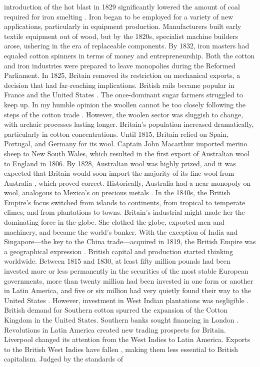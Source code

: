 introduction of the hot blast in 1829 significantly lowered the amount of coal required for iron smelting . Iron began to be employed for a variety of new applications, particularly in equipment production. Manufacturers built early textile equipment out of wood, but by the 1820s, specialist machine builders arose, ushering in the era of replaceable components. By 1832, iron masters had equaled cotton spinners  in terms of money and entrepreneurship. Both the cotton and iron industries were prepared to leave monopolies during the Reformed Parliament. In 1825, Britain removed its restriction on mechanical exports, a decision that had far-reaching implications. British rails became popular in France and the United States . The once-dominant sugar farmers struggled to keep up. In my humble opinion the woollen cannot be too closely following the steps of the cotton trade . However, the woolen sector was sluggish to change, with archaic processes lasting longer. Britain's population increased dramatically, particularly in cotton concentrations. Until 1815, Britain relied on Spain, Portugal, and Germany for its wool. Captain John Macarthur imported merino sheep to New South Wales, which resulted in the first export of Australian wool to England in 1806. By 1828, Australian wool was highly prized, and it was expected that Britain would soon import the majority of its fine wool from Australia , which proved correct. Historically, Australia had a near-monopoly on wool, analogous to Mexico's on precious metals . In the 1840s, the British Empire's focus switched from islands to continents, from tropical to temperate climes, and from plantations to towns. Britain's industrial might made her the dominating force in the globe. She clothed the globe, exported men and machinery, and became the world's banker. With the exception of India and Singapore—the key to the China trade—acquired in 1819, the British Empire was a geographical expression . British capital and production started thinking worldwide. Between 1815 and 1830, at least fifty million pounds had been invested more or less permanently in the securities of the most stable European governments, more than twenty million had been invested in one form or another in Latin America, and five or six million had very quietly found their way to the United States . However, investment in West Indian plantations was negligible . British demand for Southern cotton spurred the expansion of the Cotton Kingdom in the United States. Southern banks sought financing in London . Revolutions in Latin America created new trading prospects for Britain. Liverpool changed its attention from the West Indies to Latin America. Exports to the British West Indies have fallen , making them less essential to British capitalism. Judged by the standards of 